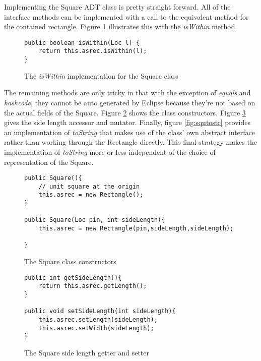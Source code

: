 \documentclass[]{tufte-handout}
\begin{document}
Implementing the Square ADT class is pretty straight forward. All of the interface methods can be implemented with a call to the equivalent method for the contained rectangle. Figure \ref{fig:squiswithin} illustrates this with the \textit{isWithin} method.

\begin{figure}
\begin{lstlisting}
public boolean isWithin(Loc l) {
	return this.asrec.isWithin(l);
}
\end{lstlisting}
\label{fig:squiswithin}
\caption{The \textit{isWithin} implementation for the Square class}
\end{figure}

The remaining methods are only tricky in that with the exception of \textit{equals} and \textit{hashcode}, they cannot be auto generated by Eclipse because they're not based on the actual fields of the Square. Figure \ref{fig:squctor} shows the class constructors. Figure \ref{fig:squgetset} gives the side length accessor and mutator. Finally, figure \ref{fig:squtostr} provides an implementation of \textit{toString} that makes use of the class' own abstract interface rather than working through the Rectangle directly. This final strategy makes the implementation of \textit{toString} more or less independent of the choice of representation of the Square.

\begin{figure}
\begin{lstlisting}
public Square(){
	// unit square at the origin
	this.asrec = new Rectangle();
}

public Square(Loc pin, int sideLength){
	this.asrec = new Rectangle(pin,sideLength,sideLength);

}
\end{lstlisting}
\label{fig:squctor}
\caption{The Square class constructors}
\end{figure}

\begin{figure}
\begin{lstlisting}
public int getSideLength(){
	return this.asrec.getLength();
}

public void setSideLength(int sideLength){
	this.asrec.setLength(sideLength);
	this.asrec.setWidth(sideLength);
}
\end{lstlisting}
\label{fig:squgetset}
\caption{The Square side length getter and setter}
\end{figure}
\end{document}
